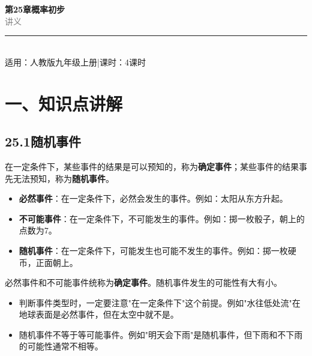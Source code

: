 \documentclass[12pt, a4paper]{ctexart}
\begin{document}
\begin{center}
{\Huge\bfseries\textcolor{mainblue}{第25章\quad 概率初步}}\\[12pt]
{\Large\textcolor{gray}{讲\quad 义}}\\[8pt]
\rule{0.6\textwidth}{1pt}\\[8pt]
{\normalsize 适用：人教版\quad 九年级上册\quad |\quad 课时：4课时}
\end{center}
\vspace{10pt}

\section*{\textcolor{mainblue}{一、知识点讲解}}

\subsection*{25.1\quad 随机事件}

\begin{knowledgebox}[1. 确定事件与随机事件]
在一定条件下，某些事件的结果是可以预知的，称为\textbf{确定事件}；某些事件的结果事先无法预知，称为\textbf{随机事件}。

\medskip
\begin{itemize}[leftmargin=2em]
  \item \textbf{必然事件}：在一定条件下，必然会发生的事件。例如：太阳从东方升起。
  \item \textbf{不可能事件}：在一定条件下，不可能发生的事件。例如：掷一枚骰子，朝上的点数为7。
  \item \textbf{随机事件}：在一定条件下，可能发生也可能不发生的事件。例如：掷一枚硬币，正面朝上。
\end{itemize}

\medskip
必然事件和不可能事件统称为\textbf{确定事件}。随机事件发生的可能性有大有小。
\end{knowledgebox}

\begin{warnbox}[易错提醒]
\begin{itemize}[leftmargin=2em]
  \item 判断事件类型时，一定要注意"在一定条件下"这个前提。例如"水往低处流"在地球表面是必然事件，但在太空中就不是。
  \item 随机事件不等于等可能事件。例如"明天会下雨"是随机事件，但下雨和不下雨的可能性通常不相等。
\end{itemize}
\end{warnbox}
\end{document}
